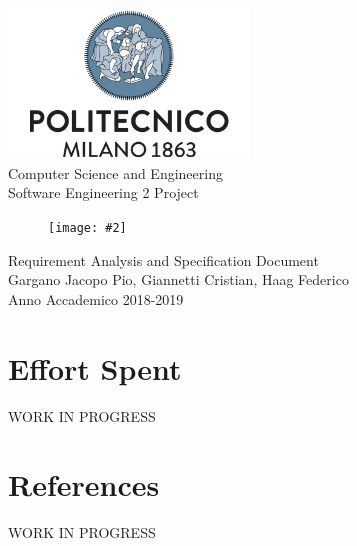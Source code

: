 \documentclass{report}
\newcommand{\image}[4]{
\begin{figure}[h]
\centering
\texttt{[image: \#2]}
\caption*{#3}
\label{#4}
\end{figure}
}
\begin{document}
	\begin{titlepage}
		\centering	
		\vfill
		{
			\includegraphics[width =\linewidth, height = 4cm, keepaspectratio]{PolitecnicoLogo.png}
			\label{fig:PolitecnicoLogo}
			\large \\[2ex]Computer Science and Engineering\\
			\large Software Engineering 2 Project\\[10ex]			
			\image{5cm}{TrackMeLogo.png}{}{TrackMeLogo}
			\huge Requirement Analysis and Specification Document\\[2ex]
			\normalsize Gargano Jacopo Pio, Giannetti Cristian, Haag Federico\\[1ex]
			\normalsize Anno Accademico 2018-2019	 
		}
		
	\end{titlepage}

	
	\newpage
	\tableofcontents
	\let\tableofcontents\relax
	
	\newpage
	
	
	
	
	
		
	\chapter{Effort Spent}
	WORK IN PROGRESS
	\chapter{References}
	WORK IN PROGRESS
	
\end{document}

